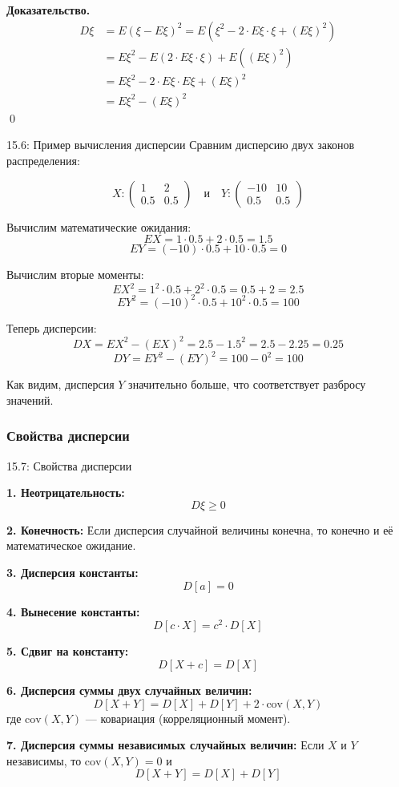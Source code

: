 \documentclass[a4paper,12pt]{article}
\newcommand{\myproof}{\textbf{Доказательство.}\ }
\begin{document}
	\myproof
	\begin{align*}
		D\xi &= E(\xi - E\xi)^2 = E(\xi^2 - 2 \cdot E\xi \cdot \xi + (E\xi)^2) \\
		&= E\xi^2 - E(2 \cdot E\xi \cdot \xi) + E((E\xi)^2) \\
		&= E\xi^2 - 2 \cdot E\xi \cdot E\xi + (E\xi)^2 \\
		&= E\xi^2 - (E\xi)^2
	\end{align*}
	\qed
	
	\begin{examplebox}{15.6: Пример вычисления дисперсии}
		Сравним дисперсию двух законов распределения:
		
		\[ X: \begin{pmatrix} 1 & 2 \\ 0.5 & 0.5 \end{pmatrix} \quad\text{и}\quad Y: \begin{pmatrix} -10 & 10 \\ 0.5 & 0.5 \end{pmatrix} \]
		
		Вычислим математические ожидания:
		\[ EX = 1 \cdot 0.5 + 2 \cdot 0.5 = 1.5 \]
		\[ EY = (-10) \cdot 0.5 + 10 \cdot 0.5 = 0 \]
		
		Вычислим вторые моменты:
		\[ EX^2 = 1^2 \cdot 0.5 + 2^2 \cdot 0.5 = 0.5 + 2 = 2.5 \]
		\[ EY^2 = (-10)^2 \cdot 0.5 + 10^2 \cdot 0.5 = 100 \]
		
		Теперь дисперсии:
		\[ DX = EX^2 - (EX)^2 = 2.5 - 1.5^2 = 2.5 - 2.25 = 0.25 \]
		\[ DY = EY^2 - (EY)^2 = 100 - 0^2 = 100 \]
		
		Как видим, дисперсия \(Y\) значительно больше, что соответствует разбросу значений.
	\end{examplebox}
	
	\subsubsection{Свойства дисперсии}
	
	\begin{propertybox}{15.7: Свойства дисперсии}
		
		\textbf{1. Неотрицательность:}
		\[ D\xi \ge 0 \]
		
		\textbf{2. Конечность:}
		Если дисперсия случайной величины конечна, то конечно и её математическое ожидание.
		
		\textbf{3. Дисперсия константы:}
		\[ D[a] = 0 \]
		
		\textbf{4. Вынесение константы:}
		\[ D[c \cdot X] = c^2 \cdot D[X] \]
		
		\textbf{5. Сдвиг на константу:}
		\[ D[X + c] = D[X] \]
		
		\textbf{6. Дисперсия суммы двух случайных величин:}
		\[ D[X + Y] = D[X] + D[Y] + 2 \cdot \text{cov}(X, Y) \]
		где \(\text{cov}(X, Y)\) — ковариация (корреляционный момент).
		
		\textbf{7. Дисперсия суммы независимых случайных величин:}
		Если \(X\) и \(Y\) независимы, то \(\text{cov}(X, Y) = 0\) и
		\[ D[X + Y] = D[X] + D[Y] \]
	\end{propertybox}
	
\end{document}
